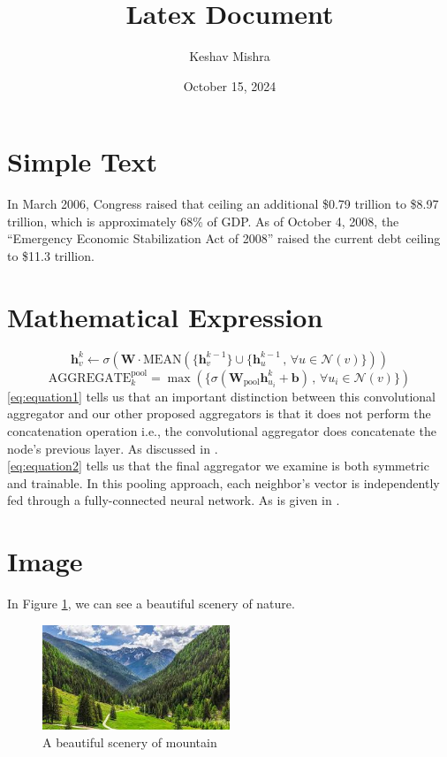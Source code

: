 \documentclass{article}
\title{Latex Document}
\author{Keshav Mishra}
\date{October 15, 2024}
\begin{document}
	\maketitle
	\section{Simple Text}
	In March 2006, Congress raised that ceiling an additional \$0.79 trillion to
	\$8.97 trillion, which is approximately 68\% of GDP. As of October 4, 2008, the
	“Emergency Economic Stabilization Act of 2008” raised the current debt
	ceiling to \$11.3 trillion.
	\section{Mathematical Expression}
	
	\begin{equation}
		\mathbf{h}_v^k \leftarrow \sigma \left( \mathbf{W} \cdot \text{MEAN} \left( \{ \mathbf{h}_v^{k-1} \} \cup \{ \mathbf{h}_{u}^{k-1} \, , \, \forall u \in \mathcal{N}(v) \} \right) \right)
		\label{eq:equation1}
	\end{equation}
	\begin{equation}
		\text{AGGREGATE}_{k}^{\text{pool}} = \max \left( \{ \sigma \left( \mathbf{W}_{\text{pool}} \mathbf{h}_{u_i}^{k} + \mathbf{b} \right) \, , \, \forall u_i \in \mathcal{N}(v) \} \right)	
		\label{eq:equation2}    
	\end{equation}	
	\ref{eq:equation1} tells us that an important distinction between this convolutional aggregator
	and our other proposed aggregators is that it does not perform the concatenation operation i.e., the convolutional aggregator does concatenate the node’s previous layer. As discussed in \cite{10.1145/1150402.1150479}.\\
	\ref{eq:equation2} tells us that the final aggregator we examine is both symmetric and trainable. In this
	pooling approach, each neighbor’s vector is independently fed through a fully-connected neural
	network. As is given in \cite{10.1145/3219819.3219890}.
	\section{Image}
	In Figure \ref{fig: Landscape's_image}, we can see a beautiful scenery of nature.
	\begin{figure}[H]
		\centering
		\includegraphics[width=0.5\textwidth]{landscape.jpg}
		\caption{A beautiful scenery of mountain}
		\label{fig: Landscape's_image}
	\end{figure}
\end{document}

